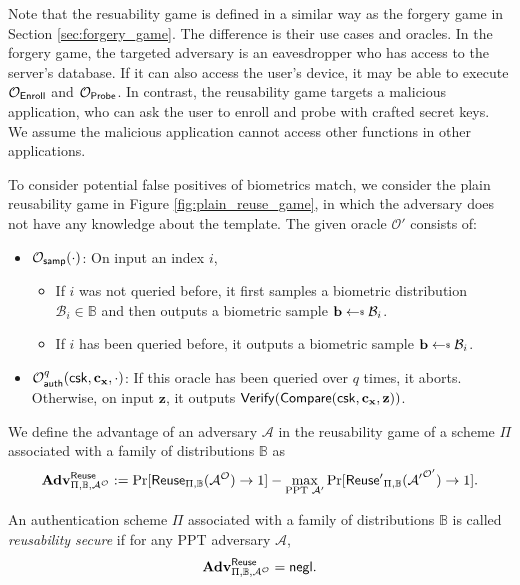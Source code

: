 Note that the resuability game is defined in a similar way as the forgery game in Section \ref{sec:forgery_game}. The difference is their use cases and oracles. In the forgery game, the targeted adversary is an eavesdropper who has access to the server's database. If it can also access the user's device, it may be able to execute $\mathcal{O}_{\sf Enroll}$ and $\mathcal{O}_{\sf Probe}$. In contrast, the reusability game targets a malicious application, who can ask the user to enroll and probe with crafted secret keys. We assume the malicious application cannot access other functions in other applications.

To consider potential false positives of biometrics match, we consider the plain reusability game in Figure \ref{fig:plain_reuse_game}, in which the adversary does not have any knowledge about the template. The given oracle $\mathcal{O'}$ consists of:

\begin{itemize}

	\item $\mathcal{O}_{\sf samp}(\cdot)$: On input an index $i$,
	\begin{itemize}
		\item If $i$ was not queried before, it first samples a biometric distribution $\mathcal{B}_i \in \mathbb{B}$ and then outputs a biometric sample $\mathbf{b} \getsdollar \mathcal{B}_i$.
		\item If $i$ has been queried before, it outputs a biometric sample $\mathbf{b} \getsdollar \mathcal{B}_i$.
	\end{itemize}
	
	\item $\mathcal{O}_{\sf auth}^{q}({\sf csk}, \mathbf{c_x}, \cdot)$: If this oracle has been queried over $q$ times, it aborts. Otherwise, on input $\mathbf{z}$, it outputs ${\sf Verify}({\sf Compare}({\sf csk}, \mathbf{c_x}, \mathbf{z}))$.

\end{itemize}


We define the advantage of an adversary $\mathcal{A}$ in the reusability game of a scheme $\Pi$ associated with a family of distributions $\mathbb{B}$ as
\[
	\mathbf{Adv}^{\sf Reuse}_{\Pi, \mathbb{B}, \mathcal{A}^\mathcal{O}} := \Pr[{\sf Reuse}_{\Pi, \mathbb{B}}(\mathcal{A}^\mathcal{O}) \to 1] -
	\max_{\text{PPT } \mathcal{A}'} \Pr[{\sf Reuse'}_{\Pi, \mathbb{B}}(\mathcal{A'}^\mathcal{O'}) \to 1].
\]

An authentication scheme $\Pi$ associated with a family of distributions $\mathbb{B}$ is called \emph{reusability secure} if for any PPT adversary $\mathcal{A}$,
\[
	\mathbf{Adv}^{\sf Reuse}_{\Pi, \mathbb{B}, \mathcal{A^\mathcal{O}}} = \mathsf{negl}.
\]


